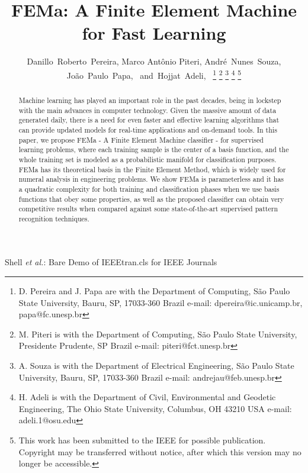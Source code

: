 \documentclass[journal]{IEEEtran}
\begin{document}
\title{FEMa: A Finite Element Machine for Fast Learning}

\author{Danillo~Roberto~Pereira, Marco Ant\^onio Piteri, Andr\'e~Nunes~Souza,        
		Jo\~ao~Paulo~Papa,~
        and~Hojjat~Adeli,~%
\thanks{D. Pereira and J. Papa are with the Department
of Computing, S\~ao Paulo State University, Bauru, SP, 17033-360
 Brazil e-mail: dpereira@ic.unicamp.br, papa@fc.unesp.br}%
 \thanks{M. Piteri is with the Department
of Computing, S\~ao Paulo State University, Presidente Prudente, SP
 Brazil e-mail: piteri@fct.unesp.br}
 \thanks{A. Souza is with the Department
of Electrical Engineering, S\~ao Paulo State University, Bauru, SP, 17033-360
 Brazil e-mail: andrejau@feb.unesp.br}
\thanks{H. Adeli is with the Department of Civil, Environmental and Geodetic Engineering, The Ohio State University, Columbus, OH 43210 USA e-mail: adeli.1@osu.edu}%
\thanks{This work has been submitted to the IEEE for possible publication.  Copyright may be transferred without notice, after which this version may no longer be accessible.}}

%
{Shell \MakeLowercase{\textit{et al.}}: Bare Demo of IEEEtran.cls for IEEE Journals}

\maketitle

\begin{abstract}
Machine learning has played an important role in the past decades, being in lockstep with the main advances in computer technology. Given the massive amount of data generated daily, there is a need for even faster and effective learning algorithms that can provide updated models for real-time applications and on-demand tools. In this paper, we propose FEMa - A Finite Element Machine classifier - for supervised learning problems, where each training sample is the center of a basis function, and the whole training set is modeled as a probabilistic manifold for classification purposes. FEMa has its theoretical basis in the Finite Element Method, which is widely used for numeral analysis in engineering problems. We show FEMa is parameterless and it has a quadratic complexity for both training and classification phases when we use basis functions that obey some properties, as well as the proposed classifier can obtain very competitive results when compared against some state-of-the-art supervised pattern recognition techniques.
\end{abstract}
\end{document}
